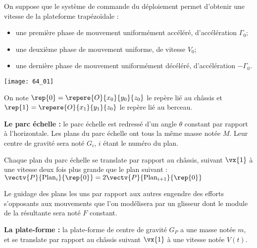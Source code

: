 \normalfalse \difficiletrue \tdifficilefalse
\correctionfalse



\setcounter{question}{0}%
\ifcorrection
\else
{}
\fi

\ifprof
\else
On suppose que le système de commande du déploiement permet d’obtenir une vitesse de la plateforme
trapézoïdale :
\begin{itemize}
\item une première phase de mouvement uniformément accéléré, d’accélération $\Gamma_0$;
\item une deuxième phase de mouvement uniforme, de vitesse $V_0$;
\item une dernière phase de mouvement uniformément décéléré, d’accélération $-\Gamma_0$.
\end{itemize}
 
\begin{marginfigure}
\texttt{[image: 64\_01]}
\end{marginfigure}


On note $\rep{0}=\repere{O}{x_0}{y_0}{z_0}$ le repère lié au châssis et
$\rep{1}=\repere{O}{x_1}{y_1}{z_0}$ le repère lié au berceau.

\textbf{Le parc échelle :} le parc échelle est redressé d’un angle $\theta$ constant par rapport à l’horizontale.
Les plans du parc échelle ont tous la même masse notée $M$. Leur centre de gravité sera noté $G_i$,
$i$ étant le numéro du plan.

Chaque plan du parc échelle se translate par rapport au châssis, suivant $\vx{1}$ à une vitesse deux
fois plus grande que le plan suivant :  $\vectv{P}{\text{Plan}_i}{\rep{0}}=2\vectv{P}{\text{Plan}_{i+1}}{\rep{0}}$

Le guidage des plans les uns par rapport aux autres engendre des efforts s’opposants aux
mouvements que l’on modélisera par un glisseur dont le module de la résultante sera noté $F$
constant.

\textbf{La plate-forme :} la plate-forme de centre de gravité $G_P$ a une masse notée $m$, et se translate par rapport au
châssis suivant $\vx{1}$ à une vitesse notée $V(t)$.

